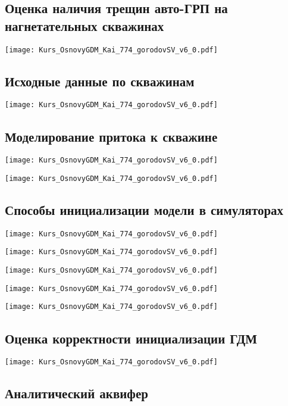 \documentclass[main.tex]{subfiles}
\begin{document}
\subsection{Оценка наличия трещин авто-ГРП на нагнетательных скважинах}

\texttt{[image: Kurs\_OsnovyGDM\_Kai\_774\_gorodovSV\_v6\_0.pdf]}

\subsection{Исходные данные по скважинам}

\texttt{[image: Kurs\_OsnovyGDM\_Kai\_774\_gorodovSV\_v6\_0.pdf]}

\subsection{Моделирование притока к скважине}

\texttt{[image: Kurs\_OsnovyGDM\_Kai\_774\_gorodovSV\_v6\_0.pdf]}

\texttt{[image: Kurs\_OsnovyGDM\_Kai\_774\_gorodovSV\_v6\_0.pdf]}

\subsection{Способы инициализации модели в симуляторах}

\texttt{[image: Kurs\_OsnovyGDM\_Kai\_774\_gorodovSV\_v6\_0.pdf]}

\texttt{[image: Kurs\_OsnovyGDM\_Kai\_774\_gorodovSV\_v6\_0.pdf]}

\texttt{[image: Kurs\_OsnovyGDM\_Kai\_774\_gorodovSV\_v6\_0.pdf]}

\texttt{[image: Kurs\_OsnovyGDM\_Kai\_774\_gorodovSV\_v6\_0.pdf]}

\texttt{[image: Kurs\_OsnovyGDM\_Kai\_774\_gorodovSV\_v6\_0.pdf]}

\subsection{Оценка корректности инициализации ГДМ}

\texttt{[image: Kurs\_OsnovyGDM\_Kai\_774\_gorodovSV\_v6\_0.pdf]}

\subsection{Аналитический аквифер}
\end{document}
